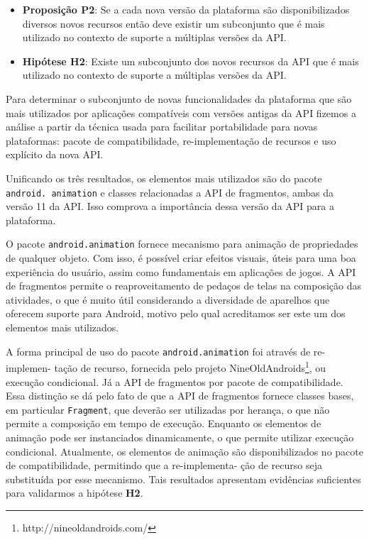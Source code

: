 \begin{itemize}
	\item \textbf{Proposição P2}: Se a cada nova versão da plataforma são disponibilizados
	diversos novos recursos então deve existir um subconjunto que é mais utilizado no 
	contexto de suporte a múltiplas versões da API.
	\item \textbf{Hipótese H2}: Existe um subconjunto dos novos recursos da API que é
	mais utilizado no contexto de suporte a múltiplas versões da API.
\end{itemize}

Para determinar o subconjunto de novas funcionalidades da plataforma que são mais
utilizados por aplicações compatíveis com versões antigas da API fizemos a análise
a partir da técnica usada para facilitar portabilidade para novas plataformas: pacote
de compatibilidade, re-implementação de recursos e uso explícito da nova API.

Unificando os três resultados,  os elementos mais utilizados são do pacote
\texttt{android. animation} e classes relacionadas a API de fragmentos, ambas
da versão 11 da API. Isso comprova a importância dessa versão da API para a
plataforma. 

O pacote \texttt{android.animation} fornece mecanismo para animação de propriedades
de qualquer objeto. Com isso, é possível criar efeitos visuais, úteis para uma boa
experiência do usuário, assim como fundamentais em aplicações de jogos. A API de
fragmentos permite o reaproveitamento de pedaços de telas na composição das atividades,
o que é muito útil considerando a diversidade de aparelhos que oferecem suporte para
Android, motivo pelo qual acreditamos ser este um dos elementos mais utilizados. 

A forma principal de uso do pacote \texttt{android.animation} foi através de
re-implemen- tação de recurso, fornecida pelo projeto NineOldAndroids\footnote{http://nineoldandroids.com/},
ou execução condicional. Já a API de fragmentos por pacote de compatibilidade.
Essa distinção se dá pelo fato de que a API de fragmentos fornece classes bases,
em particular \texttt{Fragment}, que deverão ser utilizadas por herança, o que não
permite a composição em tempo de execução. Enquanto os elementos de animação pode
ser instanciados dinamicamente, o que permite utilizar execução condicional.
Atualmente, os elementos de animação são disponibilizados no pacote de compatibilidade,
permitindo que a re-implementa- ção de recurso seja substituída por esse mecanismo.
Tais resultados apresentam evidências suficientes para validarmos a hipótese \textbf{H2}.

